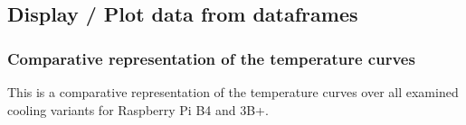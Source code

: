 \documentclass [oneside,10pt,a4paper,ngerman,BCOR10mm,headsepline,parindent,final]{scrartcl}
\begin{document}
    \hypertarget{display-plot-data-from-dataframes}{%
\subsection{Display / Plot data from
dataframes}\label{display-plot-data-from-dataframes}}

\hypertarget{comparative-representation-of-the-temperature-curves}{%
\subsubsection{Comparative representation of the temperature
curves}\label{comparative-representation-of-the-temperature-curves}}

This is a comparative representation of the temperature curves over all
examined cooling variants for Raspberry Pi B4 and 3B+.
\end{document}

